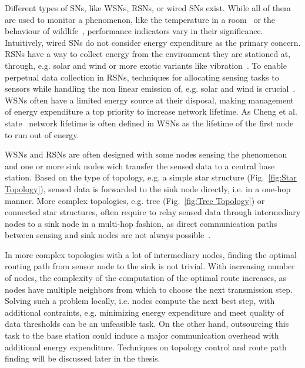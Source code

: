 Different types of \acp{SN}, like \acp{WSN}, \acp{RSN}, or wired \acp{SN}
exist. While all of them are used to monitor a phenomenon, like the temperature
in a room~\cite{labdata} or the behaviour of
wildlife~\cite{bennett2011cranetracker}, performance indicators vary in their
significance. Intuitively, wired \acp{SN} do not consider energy expenditure as
the primary concern. \acp{RSN} have a way to collect energy from the
environment they are stationed at, through, e.g. solar and wind or more exotic
variants like vibration~\cite{perpetuum}. To enable perpetual data collection
in \acp{RSN}, techniques for allocating sensing tasks to sensors while handling
the non linear emission of, e.g. solar and wind is
crucial~\cite{liu2011perpetual}. \acp{WSN} often have a limited energy source
at their disposal, making management of energy expenditure a top priority to
increase network lifetime. As Cheng et al. state~\cite{cheng2013stcdg} network
lifetime is often defined in \acp{WSN} as the lifetime of the first node to run
out of energy. 
\par
\acp{WSN} and \acp{RSN} are often designed with some nodes sensing the
phenomenon and one or more sink nodes wich transfer the sensed data to a
central base station. Based on the type of topology, e.g. a simple star
structure (Fig.~\ref{fig:Star Topology}), sensed data is forwarded to the sink
node directly, i.e. in a one-hop manner. More complex topologies, e.g. tree
(Fig.~\ref{fig:Tree Topology}) or connected star structures, often require to
relay sensed data through intermediary nodes to a sink node in a multi-hop
fashion, as direct communication paths between sensing and sink nodes are not
always possible~\cite{romer2004design}. 
\par
In more complex topologies with a lot of intermediary nodes, finding the
optimal routing path from sensor node to the sink is not trivial. With
increasing number of nodes, the complexity of the computation of the optimal
route increases, as nodes have multiple neighbors from which to choose the next
transmission step. Solving such a problem locally, i.e. nodes compute the next
best step, with additional contraints, e.g. minimizing energy expenditure and
meet quality of data thresholds can be an unfeasible task. On the other hand,
outsourcing this task to the base station could induce a major communication
overhead with additional energy expenditure. Techniques on topology control
and route path finding will be discussed later in the thesis.



